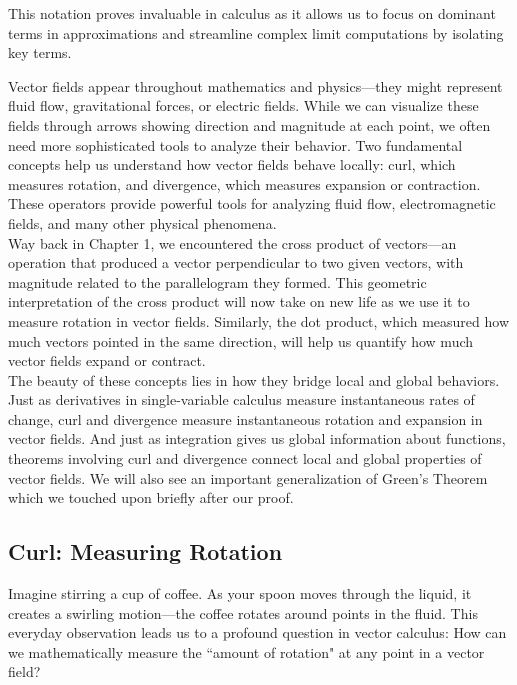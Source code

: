\noindent This notation proves invaluable in calculus as it allows us to focus on dominant terms in approximations and streamline complex limit computations by isolating key terms.



\newpage

 

\noindent Vector fields appear throughout mathematics and physics—they might represent fluid flow, gravitational forces, or electric fields. While we can visualize these fields through arrows showing direction and magnitude at each point, we often need more sophisticated tools to analyze their behavior. Two fundamental concepts help us understand how vector fields behave locally: curl, which measures rotation, and divergence, which measures expansion or contraction. These operators provide powerful tools for analyzing fluid flow, electromagnetic fields, and many other physical phenomena. \\

\noindent Way back in Chapter 1, we encountered the cross product of vectors—an operation that produced a vector perpendicular to two given vectors, with magnitude related to the parallelogram they formed. This geometric interpretation of the cross product will now take on new life as we use it to measure rotation in vector fields. Similarly, the dot product, which measured how much vectors pointed in the same direction, will help us quantify how much vector fields expand or contract. \\

\noindent The beauty of these concepts lies in how they bridge local and global behaviors. Just as derivatives in single-variable calculus measure instantaneous rates of change, curl and divergence measure instantaneous rotation and expansion in vector fields. And just as integration gives us global information about functions, theorems involving curl and divergence connect local and global properties of vector fields. We will also see an important generalization of Green's Theorem which we touched upon briefly after our proof.

\subsection*{Curl: Measuring Rotation}

\noindent Imagine stirring a cup of coffee. As your spoon moves through the liquid, it creates a swirling motion—the coffee rotates around points in the fluid. This everyday observation leads us to a profound question in vector calculus: How can we mathematically measure the ``amount of rotation" at any point in a vector field? \\

